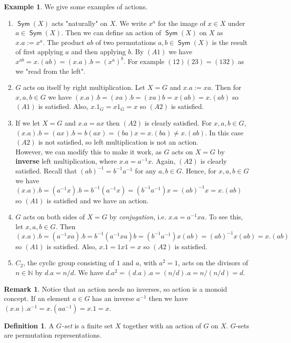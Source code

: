 \documentclass[12pt]{amsart}
\theoremstyle{definition}
\newtheorem{example}[theorem]{Example}
\newtheorem{definition}[theorem]{Definition}
\newtheorem{remark}[theorem]{Remark}
\DeclareMathOperator{\Sym}{\mathsf{Sym}}
\begin{document}
\begin{example}
We give some examples of actions.
\begin{enumerate}
\item $\Sym(X)$ acts "naturally" on $X$.  We write $x^a$ for the image of $x\in X$ under $a\in \Sym(X)$.  Then we can define an action of $\Sym(X)$ on $X$ as $x.a:=x^a$.  The product $ab$ of two permutations $a, b\in \Sym(X)$ is the result of first applying $a$ and then applying $b$.  By $(A1)$ we have $x^{ab}=x.(ab)=(x.a).b=(x^a)^b$.  For example $(12)(23)=(132)$ as we "read from the left".
\item $G$ acts on itself by right multiplication.  Let $X=G$ and $x.a:=xa$.  Then for $x, a, b\in G$ we have $(x.a).b=(xa).b=(xa)b=x(ab)=x.(ab)$ so $(A1)$ is satisfied.  Also, $x.1_G=x1_G=x$ so $(A2)$ is satisfied.
\item If we let $X=G$ and $x.a=ax$ then $(A2)$ is clearly satisfied.  For $x, a, b\in G$, $(x.a).b=(ax).b=b(ax)=(ba)x=x.(ba)\neq x.(ab)$.  In this case $(A2)$ is not satisfied, so left multiplication is not an action.\\
    However, we can modify this to make it work, as $G$ acts on $X=G$ by \textbf{inverse} left multiplication, where $x.a=a^{-1}x$.  Again, $(A2)$ is clearly satisfied.  Recall that $(ab)^{-1}=b^{-1}a^{-1}$ for any $a, b\in G$.  Hence, for $x, a, b\in G$ we have $(x.a).b=(a^{-1}x).b=b^{-1}(a^{-1}x)=(b^{-1}a^{-1})x=(ab)^{-1}x=x.(ab)$ so $(A1)$ is satisfied and we have an action.
\item $G$ acts on both sides of $X=G$ by \emph{conjugation}, i.e. $x.a=a^{-1}xa$.  To see this, let $x, a, b\in G$.  Then $(x.a).b=(a^{-1}xa).b=b^{-1}(a^{-1}xa)b=(b^{-1}a^{-1})x(ab)=(ab)^{-1}x(ab)=x.(ab)$ so $(A1)$ is satisfied.  Also, $x.1=1x1=x$ so $(A2)$ is satisfied.
\item $C_2$, the cyclic group consisting of $1$ and $a$, with $a^2=1$, acts on the divisors of $n\in\mathbb{N}$ by $d.a=n/d$.  We have $d.a^2=(d.a).a=(n/d).a=n/(n/d)=d$.
\end{enumerate}
\end{example}

\begin{remark}
Notice that an action needs no inverses, so action is a monoid concept.  If an element $a\in G$ has an inverse $a^{-1}$ then we have $(x.a).a^{-1}=x.(aa^{-1})=x.1=x$.
\end{remark}

\begin{definition}
A \emph{$G$-set} is a finite set $X$ together with an action of $G$ on $X$.  $G$-sets are permutation representations.
\end{definition}
\end{document}
